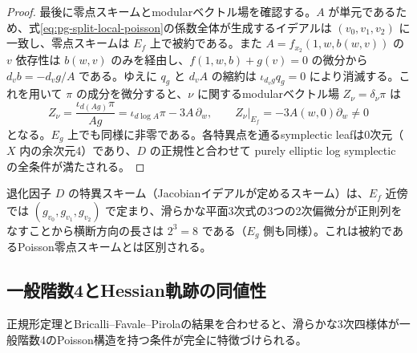 \begin{proof}
最後に零点スキームとmodularベクトル場を確認する。$A$ が単元であるため、式\eqref{eq:pg-split-local-poisson}の係数全体が生成するイデアルは $(v_0,v_1,v_2)$ に一致し、零点スキームは $E_f$ 上で被約である。また $A=f_{x_2}(1,w,b(w,v))$ の $v$ 依存性は $b(w,v)$ のみを経由し、$f(1,w,b)+g(v)=0$ の微分から $d_v b=-d_v g/A$ である。ゆえに $q_g$ と $d_v A$ の縮約は $\iota_{d_v g}q_g=0$ により消滅する。これを用いて $\pi$ の成分を微分すると、$\nu$ に関するmodularベクトル場 $Z_\nu=\delta_\nu\pi$ は
\begin{equation}
Z_\nu=\frac{\iota_{d(Ag)}\pi}{Ag}
=\iota_{d\log A}\pi-3A\,\partial_w,
\qquad
Z_\nu|_{E_f}=-3A(w,0)\partial_w\ne0
\label{eq:pg-split-modular}
\end{equation}
となる。$E_g$ 上でも同様に非零である。各特異点を通るsymplectic leafは0次元（$X$ 内の余次元4）であり、$D$ の正規性と合わせて purely elliptic log symplectic の全条件が満たされる。
\end{proof}

\begin{remark}[退化因子の特異スキームの厚み]
\label{rem:pg-split-singular-schemes}
退化因子 $D$ の特異スキーム（Jacobianイデアルが定めるスキーム）は、$E_f$ 近傍では $(g_{v_0},g_{v_1},g_{v_2})$ で定まり、滑らかな平面3次式の3つの2次偏微分が正則列をなすことから横断方向の長さは $2^3=8$ である（$E_g$ 側も同様）。これは被約であるPoisson零点スキームとは区別される。
\end{remark}

\subsection{一般階数4とHessian軌跡の同値性}\label{subsec:pg-fourfold-hessian}
正規形定理とBricalli--Favale--Pirolaの結果を合わせると、滑らかな3次四様体が一般階数4のPoisson構造を持つ条件が完全に特徴づけられる。

